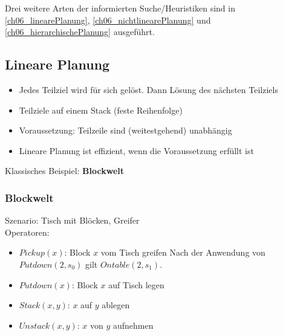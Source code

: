 
Drei weitere Arten der informierten Suche/Heuristiken sind in \autoref{ch06_linearePlanung}, \autoref{ch06_nichtlinearePlanung} und \autoref{ch06_hierarchischePlanung} ausgeführt.
\subsection{Lineare Planung}
\label{ch06_linearePlanung}
\begin{itemize}
	\item Jedes Teilziel wird für sich gelöst.
	Dann Lösung des nächsten Teilziels
	\item Teilziele auf einem Stack (feste Reihenfolge)
	\item Voraussetzung: Teilzeile sind (weitestgehend) unabhängig
	\item Lineare Planung ist effizient, wenn die Voraussetzung erfüllt ist
\end{itemize}
Klassisches Beispiel: \textbf{Blockwelt}

\subsubsection{Blockwelt}
Szenario: Tisch mit Blöcken, Greifer\\
Operatoren:
\begin{itemize}
	\item $Pickup(x)$: Block $x$ vom Tisch greifen
	Nach der Anwendung von $Putdown(2,s_0)$ gilt $Ontable(2,s_1)$.
	\item $Putdown(x)$: Block $x$ auf Tisch legen
	\item $Stack(x,y)$: $x$ auf $y$ ablegen
	\item $Unstack(x,y)$: $x$ von $y$ aufnehmen
\end{itemize}


